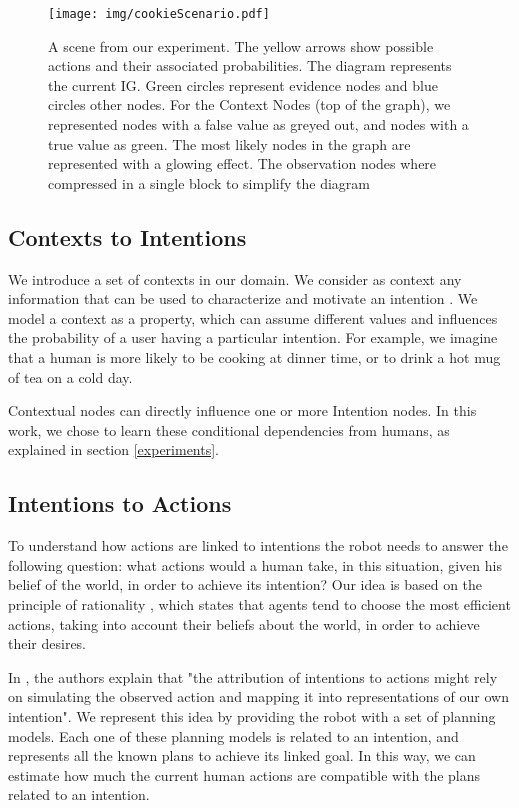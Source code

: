  \begin{figure}[h!]
	\centering
	\texttt{[image: img/cookieScenario.pdf]}
	\caption{A scene from our experiment. The yellow arrows show possible actions and their associated probabilities. The diagram represents the current IG. Green circles represent evidence nodes and blue circles other nodes. For the Context Nodes (top of the graph), we represented nodes with a false value as greyed out, and nodes with a true value as green. The most likely nodes in the graph are represented with a glowing effect. The observation nodes where compressed in a single block to simplify the diagram}
	\label{fig:intention_graph}
   	\vspace{-20pt}
\end{figure}

\subsection{Contexts to Intentions}
We introduce a set of contexts in our domain. We consider as context any information that can be used to characterize and motivate an intention \cite{abowd1999towards}. We model a context  as a property, which can assume different values and influences the probability of a user having a particular intention. For example, we imagine that a human is more likely to be cooking at dinner time, or to drink a hot mug of tea on a cold day.

Contextual nodes can directly influence one or more Intention nodes. In this work, we chose to learn these conditional dependencies from humans, as explained in section \ref{experiments}.

\subsection{Intentions to Actions}
\label{action_evaluation}
To understand how actions are linked to intentions the robot needs to answer the following question: what actions would a human take, in this situation, given his belief of the world, in order to achieve its intention?
Our idea is based on the principle of rationality \cite{Dennet1989}, which states that agents tend to choose the most efficient actions, taking into account their beliefs about the world, in order to achieve their desires.

In \cite{Blakemore2001}, the authors explain that "the attribution of intentions to actions might rely on simulating the observed action and mapping it into representations of our own intention". We represent this idea by providing the robot with a set of planning models. Each one of these planning models is related to an intention, and represents all the known plans to achieve its linked goal. In this way, we can estimate how much the current human actions are compatible with the plans related to an intention.


